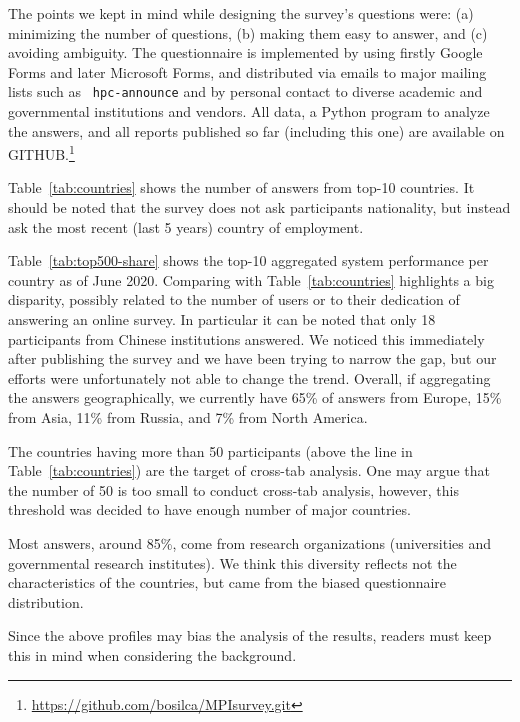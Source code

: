 \documentclass[sigconf,nonacm]{acmart}
\begin{document}
The points we kept in mind while designing the survey's questions
were: (a) minimizing the number of questions, (b) making them easy to
answer, and (c) avoiding ambiguity. The questionnaire is implemented
by using firstly Google Forms and later Microsoft Forms, and
distributed via emails to major mailing lists such as {\tt
  hpc-announce} and by personal contact to diverse academic and
governmental institutions and vendors. All data, a Python program to
analyze the answers, and all reports published so far (including this
one) are available on
GITHUB.\footnote{\url{https://github.com/bosilca/MPIsurvey.git}}

Table~\ref{tab:countries} shows the number of answers from top-10 countries. It
should be noted that the survey does not ask participants nationality, but
instead ask the most recent (last 5 years) country of employment.

Table~\ref{tab:top500-share} shows the top-10 aggregated system
performance per country as of June 2020. Comparing with
Table~\ref{tab:countries} highlights a big disparity, possibly related
to the number of users or to their dedication of answering an online
survey. In particular it can be noted that only 18 participants from
Chinese institutions answered. We noticed this immediately after
publishing the survey and we have been trying to narrow the gap, but
our efforts were unfortunately not able to change the trend. Overall,
if aggregating the answers geographically, we currently have 65\% of
answers from Europe, 15\% from Asia, 11\% from Russia, and 7\% from
North America.

The countries having more than 50 participants (above the line in
Table~\ref{tab:countries}) are the target of cross-tab analysis. One
may argue that the number of 50 is too small to conduct cross-tab
analysis, however, this threshold was decided to have enough number of 
major countries.

Most answers, around 85\%, come from research organizations
(universities and governmental research institutes).  We think this
diversity reflects not the characteristics of the countries, but
came from the biased questionnaire distribution.

Since the above profiles may bias the analysis of the results,
readers must keep this in mind when considering the background. 
\end{document}
